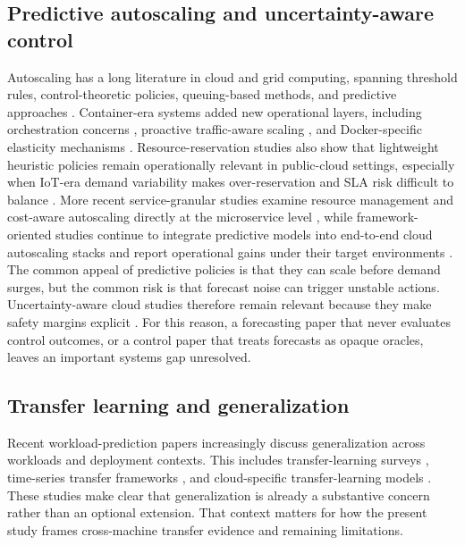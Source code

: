\subsection{Predictive autoscaling and uncertainty-aware control}

Autoscaling has a long literature in cloud and grid computing, spanning threshold rules, control-theoretic policies, queuing-based methods, and predictive approaches \citep{lorido2014review,Mao2010DeadlineBudgetAutoscaling}. Container-era systems added new operational layers, including orchestration concerns \citep{Bernstein2014ContainersCloud,Burns2016BorgKubernetes}, proactive traffic-aware scaling \citep{Kim2017ProactiveAutoscaling}, and Docker-specific elasticity mechanisms \citep{AlDhuraibi2017ElasticDocker}. Resource-reservation studies also show that lightweight heuristic policies remain operationally relevant in public-cloud settings, especially when IoT-era demand variability makes over-reservation and SLA risk difficult to balance \citep{Gul2022HeuristicResourceReservation}. More recent service-granular studies examine resource management and cost-aware autoscaling directly at the microservice level \citep{ZargarAzad2023MicroserviceFramework,Puebla2024CdaScaler}, while framework-oriented studies continue to integrate predictive models into end-to-end cloud autoscaling stacks and report operational gains under their target environments \citep{Zanussi2026LoadAwareAutoscaling}. The common appeal of predictive policies is that they can scale before demand surges, but the common risk is that forecast noise can trigger unstable actions. Uncertainty-aware cloud studies therefore remain relevant because they make safety margins explicit \citep{Minarolli2017UncertaintyPrediction,Rossi2025UncertaintyAwareForecasting}. For this reason, a forecasting paper that never evaluates control outcomes, or a control paper that treats forecasts as opaque oracles, leaves an important systems gap unresolved.

\subsection{Transfer learning and generalization}

Recent workload-prediction papers increasingly discuss generalization across workloads and deployment contexts. This includes transfer-learning surveys \citep{Weiss2016TransferLearning}, time-series transfer frameworks \citep{Ye2018TransferForecasting}, and cloud-specific transfer-learning models \citep{Liu2022TRPredictior,Hao2021TransferQoS}. These studies make clear that generalization is already a substantive concern rather than an optional extension. That context matters for how the present study frames cross-machine transfer evidence and remaining limitations.

